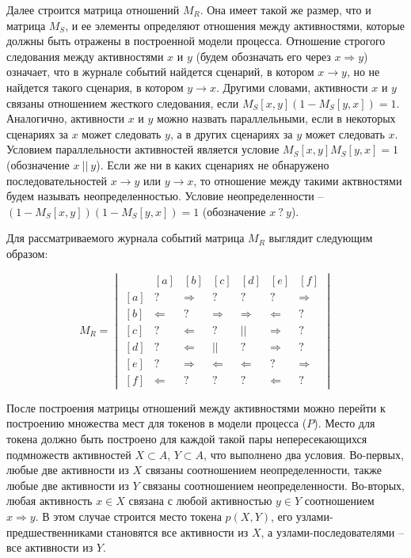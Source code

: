 \documentclass[
11pt,%
tightenlines,%
twoside,%
onecolumn,%
nofloats,%
nobibnotes,%
nofootinbib,%
superscriptaddress,%
noshowpacs,%
centertags]%
{revtex4}
\begin{document}
Далее строится матрица отношений $M_R$.
Она имеет такой же размер, что и матрица $M_S$, и ее элементы определяют отношения между активностями, которые должны быть отражены в построенной модели процесса.
Отношение строгого следования между активностями $x$ и $y$ (будем обозначать его через $x \Rightarrow y$) означает, что в журнале событий найдется сценарий, в котором $x \rightarrow y$, но не найдется такого сценария, в котором $y \rightarrow x$.
Другими словами, активности $x$ и $y$ связаны отношением жесткого следования, если $M_S[x, y](1 - M_S[y, x]) = 1$.
Аналогично, активности $x$ и $y$ можно назвать параллельными, если в некоторых сценариях за $x$ может следовать $y$, а в других сценариях за $y$ может следовать $x$.
Условием параллельности активностей является условие $M_S[x, y]M_S[y, x] = 1$ (обозначение $x \ || \ y$).
Если же ни в каких сценариях не обнаружено последовательностей $x \rightarrow y$ или $y \rightarrow x$, то отношение между такими актвностями будем называть неопределенностью.
Условие неопределенности -- $(1 - M_S[x, y])(1 - M_S[y, x]) = 1$ (обозначение $x \ ? \ y$).

Для рассматриваемого журнала событий матрица $M_R$ выглядит следующим образом:

\begin{equation}\label{eqn:r}
M_R = \begin{vmatrix}
\ & [a] & [b] & [c] & [d] & [e] & [f] \\
[a] & ? & \Rightarrow & ? & ? & ? & \Rightarrow \\ 
[b] & \Leftarrow & ? & \Rightarrow & \Rightarrow & \Leftarrow & ? \\
[c] & ? & \Leftarrow & ? & || & \Rightarrow & ? \\
[d] & ? & \Leftarrow & || & ? & \Rightarrow & ? \\
[e] & ? & \Rightarrow & \Leftarrow & \Leftarrow & ? & \Rightarrow \\
[f] & \Leftarrow & ? & ? & ? & \Leftarrow & ?
\end{vmatrix}
\end{equation}

После построения матрицы отношений между активностями можно перейти к построению множества мест для токенов в модели процесса ($P$).
Место для токена должно быть построено для каждой такой пары непересекающихся подмножеств активностей $X \subset A$, $Y \subset A$, что выполнено два условия.
Во-первых, любые две активности из $X$ связаны соотношением неопределенности, также любые две активности из $Y$ связаны соотношением неопределенности.
Во-вторых, любая активность $x \in X$ связана с любой активностью $y \in Y$ соотношением $x \Rightarrow y$. 
В этом случае строится место токена $p(X, Y)$, его узлами-предшественниками становятся все активности из $X$, а узлами-последователями -- все активности из $Y$.
\end{document}
